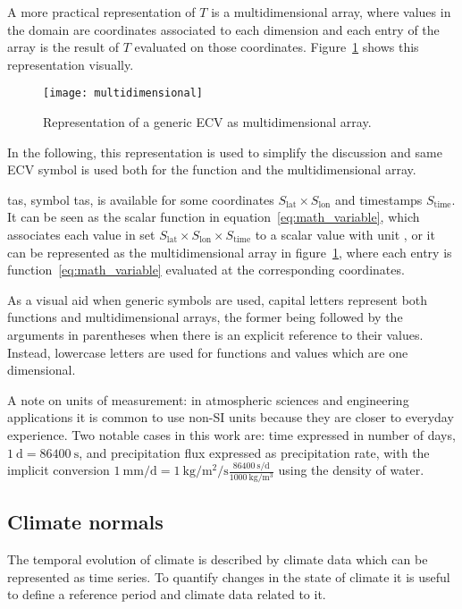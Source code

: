 A more practical representation of $T$ is a multidimensional array, where values in the domain are coordinates associated to each dimension and each entry of the array is the result of $T$ evaluated on those coordinates. Figure~\ref{fig:multidimensional} shows this representation visually.

\begin{figure}[h]
  \centering
  \texttt{[image: multidimensional]}
  \caption{Representation of a generic \gls{ECV} as multidimensional array.}
  \label{fig:multidimensional}
\end{figure}
In the following, this representation is used to simplify the discussion and same \gls{ECV} symbol is used both for the function and the multidimensional array.
\begin{example}
  \Glsdesc{tas}, symbol \gls{tas}, is available for some coordinates $S_\text{lat} \times S_\text{lon}$ and timestamps $S_\text{time}$. It can be seen as the scalar function in equation~\eqref{eq:math_variable}, which associates each value in set $S_\text{lat} \times S_\text{lon} \times S_\text{time}$ to a scalar value with unit , or it can be represented as the multidimensional array in figure~\ref{fig:multidimensional}, where each entry is function~\eqref{eq:math_variable} evaluated at the corresponding coordinates.
\end{example}

As a visual aid when generic symbols are used, capital letters represent both functions and multidimensional arrays, the former being followed by the arguments in parentheses when there is an explicit reference to their values. Instead, lowercase letters are used for functions and values which are one dimensional.

A note on units of measurement: in atmospheric sciences and engineering applications it is common to use non-SI units because they are closer to everyday experience. Two notable cases in this work are: time expressed in number of days, $\qty{1}{\day} = \qty{86400}{\second}$, and precipitation flux expressed as precipitation rate, with the implicit conversion $\qty{1}{\milli\metre\per\day} = \qty{1}{\kilo\gram\per\square\metre\per\second} \frac{\qty{86400}{\second\per\day}}{\qty{1000}{\kilo\gram\per\cubic\metre}}$ using the density of water.



\subsection{Climate normals}
\label{sec:Climate normals}
The temporal evolution of climate is described by climate data which can be represented as time series. To quantify changes in the state of climate it is useful to define a reference period and climate data related to it.

